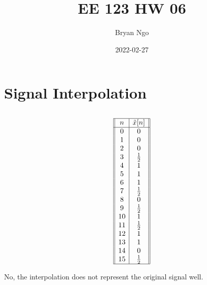 \documentclass{article}
\title{EE 123 HW 06}
\author{Bryan Ngo}
\date{2022-02-27}
\begin{document}
\maketitle

\setcounter{section}{1}

\section{Signal Interpolation}

\subsection{}

\begin{equation}
    \begin{array}{||c|c||}
        \hline
        n & \tilde{x}[n] \\
        \hline
        0 & 0 \\
        1 & 0 \\
        2 & 0 \\
        3 & \frac{1}{2} \\
        4 & 1 \\
        5 & 1 \\
        6 & 1 \\
        7 & \frac{1}{2} \\
        8 & 0 \\
        9 & \frac{1}{2} \\
        10 & 1 \\
        11 & \frac{1}{2} \\
        12 & 1 \\
        13 & 1 \\
        14 & 0 \\
        15 & \frac{1}{2} \\
        \hline
    \end{array}
\end{equation}
\begin{center}
\end{center}
No, the interpolation does not represent the original signal well.
\end{document}

